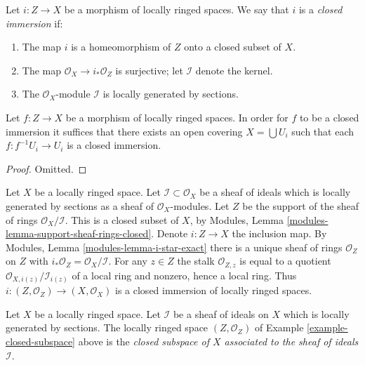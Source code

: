 \begin{definition}
\label{definition-closed-immersion-locally-ringed-spaces}
Let $i : Z \to X$ be a morphism of locally ringed spaces.
We say that $i$ is a {\it closed immersion} if:
\begin{enumerate}
\item The map $i$ is a homeomorphism of $Z$ onto a closed subset of $X$.
\item The map $\mathcal{O}_X \to i_*\mathcal{O}_Z$ is surjective;
let $\mathcal{I}$ denote the kernel.
\item The $\mathcal{O}_X$-module $\mathcal{I}$
is locally generated by sections.
\end{enumerate}
\end{definition}

\begin{lemma}
\label{lemma-closed-local-target}
Let $f : Z \to X$ be a morphism of locally ringed spaces.
In order for $f$ to be a closed immersion it suffices
that there exists an open covering $X = \bigcup U_i$ such
that each $f : f^{-1}U_i \to U_i$ is a closed immersion.
\end{lemma}

\begin{proof}
Omitted.
\end{proof}

\begin{example}
\label{example-closed-subspace}
Let $X$ be a locally ringed space.
Let $\mathcal{I} \subset \mathcal{O}_X$ be a sheaf
of ideals which is locally generated by sections as a sheaf
of $\mathcal{O}_X$-modules. Let $Z$ be the support of
the sheaf of rings $\mathcal{O}_X/\mathcal{I}$.
This is a closed subset of $X$, by
Modules, Lemma \ref{modules-lemma-support-sheaf-rings-closed}.
Denote $i : Z \to X$ the inclusion map.
By Modules, Lemma \ref{modules-lemma-i-star-exact}
there is a unique sheaf of rings $\mathcal{O}_Z$ on $Z$
with $i_*\mathcal{O}_Z = \mathcal{O}_X/\mathcal{I}$.
For any $z \in Z$ the stalk $\mathcal{O}_{Z, z}$
is equal to a quotient $\mathcal{O}_{X, i(z)}/\mathcal{I}_{i(z)}$
of a local ring and nonzero, hence a local ring.
Thus $i : (Z, \mathcal{O}_Z) \to (X, \mathcal{O}_X)$ is
a closed immersion of locally ringed spaces.
\end{example}

\begin{definition}
\label{definition-closed-subspace}
Let $X$ be a locally ringed space.
Let $\mathcal{I}$ be a sheaf of ideals on $X$
which is locally generated by sections.
The locally ringed space $(Z, \mathcal{O}_Z)$
of Example \ref{example-closed-subspace} above
is the {\it closed subspace of $X$ associated to
the sheaf of ideals $\mathcal{I}$}.
\end{definition}

